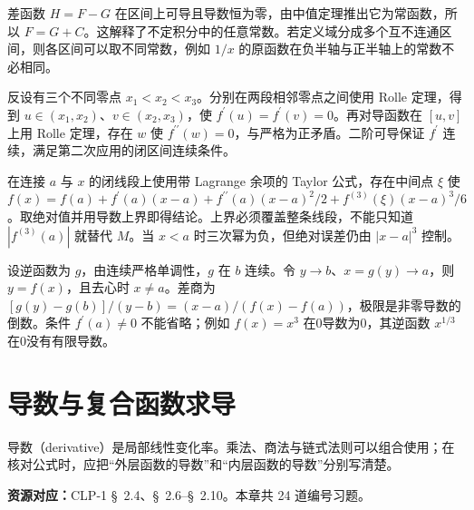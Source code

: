 \documentclass[UTF8,12pt,a4paper,fontset=fandol]{ctexart}
\begin{document}
\begin{solve}\label{ans:c7q17}
差函数 $H=F-G$ 在区间上可导且导数恒为零，由中值定理推出它为常函数，所以 $F=G+C$。这解释了不定积分中的任意常数。若定义域分成多个互不连通区间，则各区间可以取不同常数，例如 $1/x$ 的原函数在负半轴与正半轴上的常数不必相同。
\end{solve}

\begin{solve}\label{ans:c7q18}
反设有三个不同零点 $x_1<x_2<x_3$。分别在两段相邻零点之间使用 Rolle 定理，得到 $u\in(x_1,x_2)$、$v\in(x_2,x_3)$，使 $f^{\prime}(u)=f^{\prime}(v)=0$。再对导函数在 $[u,v]$ 上用 Rolle 定理，存在 $w$ 使 $f^{\prime\prime}(w)=0$，与严格为正矛盾。二阶可导保证 $f^{\prime}$ 连续，满足第二次应用的闭区间连续条件。
\end{solve}

\begin{solve}\label{ans:c7q19}
在连接 $a$ 与 $x$ 的闭线段上使用带 Lagrange 余项的 Taylor 公式，存在中间点 $\xi$ 使 $f(x)=f(a)+f^{\prime}(a)(x-a)+f^{\prime\prime}(a)(x-a)^2/2+f^{(3)}(\xi)(x-a)^3/6$。取绝对值并用导数上界即得结论。上界必须覆盖整条线段，不能只知道 $|f^{(3)}(a)|$ 就替代 $M$。当 $x<a$ 时三次幂为负，但绝对误差仍由 $|x-a|^3$ 控制。
\end{solve}

\begin{solve}\label{ans:c7q20}
设逆函数为 $g$，由连续严格单调性，$g$ 在 $b$ 连续。令 $y\to b$、$x=g(y)\to a$，则 $y=f(x)$，且去心时 $x\ne a$。差商为 $[g(y)-g(b)]/(y-b)=(x-a)/(f(x)-f(a))$，极限是非零导数的倒数。条件 $f^{\prime}(a)\ne0$ 不能省略；例如 $f(x)=x^3$ 在0导数为0，其逆函数 $x^{1/3}$ 在0没有有限导数。
\end{solve}

\clearpage
\section{导数与复合函数求导}\label{sec:ch8}
导数（derivative）是局部线性变化率。乘法、商法与链式法则可以组合使用；在核对公式时，应把“外层函数的导数”和“内层函数的导数”分别写清楚。

\textbf{资源对应：}CLP-1 \S~2.4、\S~2.6--\S~2.10。本章共 24 道编号习题。
\end{document}
